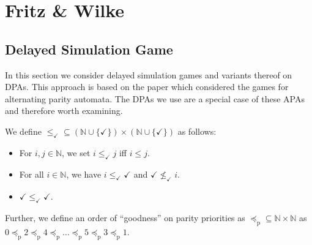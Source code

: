 
\section{Fritz \& Wilke}

\subsection{Delayed Simulation Game}
In this section we consider delayed simulation games and variants thereof on DPAs. This approach is based on the paper \cite{} which considered the games for alternating parity automata. The DPAs we use are a special case of these APAs and therefore worth examining.

\begin{defn}
	We define $\leq_\checkmark \subseteq (\mathbb{N} \cup \{\checkmark\}) \times (\mathbb{N} \cup \{\checkmark\})$ as follows:
	\begin{itemize}
		\item For $i, j \in \mathbb{N}$, we set $i \leq_\checkmark j$ iff $i \leq j$.
		\item For all $i \in \mathbb{N}$, we have $i \leq_\checkmark \checkmark$ and $\checkmark \not\leq_\checkmark i$.
		\item $\checkmark \leq_\checkmark \checkmark$.
	\end{itemize}
	
	Further, we define an order of \enquote{goodness} on parity priorities as $\preceq_\text{p} \subseteq \mathbb{N} \times \mathbb{N}$ as $0 \preceq_\text{p} 2 \preceq_\text{p} 4 \preceq_\text{p} \dots \preceq_\text{p} 5 \preceq_\text{p} 3 \preceq_\text{p} 1$.
\end{defn}

